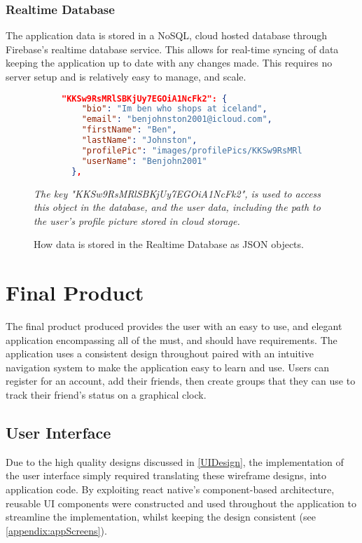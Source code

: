 \subsubsection{Realtime Database}
The application data is stored in a NoSQL, cloud hosted database through Firebase's realtime database service. This allows for real-time syncing of data keeping the application up to date with any changes made. This requires no server setup and is relatively easy to manage, and scale.
\begin{figure}[!htbp]
\centering
\begin{subfigure}[b]{0.85\textwidth}
\begin{lstlisting}[language=json]
"KKSw9RsMRlSBKjUy7EGOiA1NcFk2": {
    "bio": "Im ben who shops at iceland",
    "email": "benjohnston2001@icloud.com",
    "firstName": "Ben",
    "lastName": "Johnston",
    "profilePic": "images/profilePics/KKSw9RsMRlSBKjUy7EGOiA1NcFk2",
    "userName": "Benjohn2001"
  },
\end{lstlisting}
\end{subfigure}
\caption{How data is stored in the Realtime Database as JSON objects.}
\small\par\textit{{The key "KKSw9RsMRlSBKjUy7EGOiA1NcFk2", is used to access this object in the database, and the user data, including the path to the user's profile picture stored in cloud storage.}}
\label{jsonResp}
\end{figure}

\section{Final Product}
The final product produced provides the user with an easy to use, and elegant application encompassing all of the must, and should have requirements. The application uses a consistent design throughout paired with an intuitive navigation system to make the application easy to learn and use. Users can register for an account, add their friends, then create groups that they can use to track their friend's status on a graphical clock.
\subsection{User Interface}
Due to the high quality designs discussed in \ref{UIDesign}, the implementation of the user interface simply required translating these wireframe designs, into application code.
By exploiting react native's component-based architecture, reusable UI components were constructed and used throughout the application to streamline the implementation, whilst keeping the design consistent (see \ref{appendix:appScreens}).
